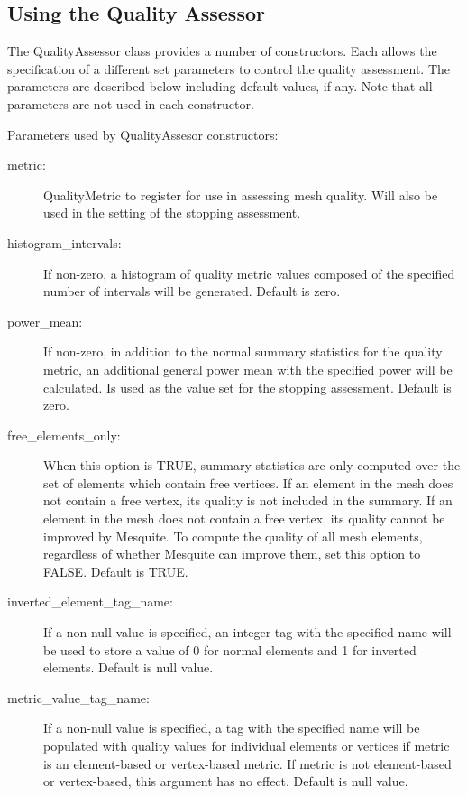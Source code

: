 \subsection{Using the Quality Assessor}

  The QualityAssessor class provides a number of constructors.  Each allows the specification of a different set parameters to control the quality assessment.  The parameters are described below including default values, if any. Note that all parameters are not used in each constructor.

\label{QA_params}
Parameters used by QualityAssesor constructors:
\begin{description}
\item[metric:]   QualityMetric to register for use in assessing mesh quality.  Will also be used in the setting of the stopping assessment.

\item[histogram\_intervals:]   If non-zero, a histogram of quality metric values composed of the specified number of intervals will be generated.  Default is zero.
\item[power\_mean:] If non-zero, in addition to the normal summary statistics for the quality metric, an additional general power mean with the specified power will be calculated.  Is used as the value set for the stopping assessment.  Default is zero.

\item[free\_elements\_only:] When this option is TRUE, summary statistics are only computed over the set of elements which contain free vertices. If an element in the mesh does not contain a free vertex, its quality is not included in the summary.  If an element in the mesh does not contain a free vertex, its quality cannot be improved by Mesquite.  To compute the quality of all mesh elements, regardless of whether Mesquite can improve them, set this option to FALSE.  Default is TRUE.

\item[inverted\_element\_tag\_name:] If a non-null value is specified, an integer tag with the specified name will be used to store a value of 0 for normal elements and 1 for inverted elements.  Default is null value.

\item[metric\_value\_tag\_name:] If a non-null value is specified, a tag with the specified name will be populated with quality values for individual elements or vertices if metric is an element-based or vertex-based metric.  If metric is not element-based or vertex-based, this argument has no effect.  Default is null value.


\end{description}
